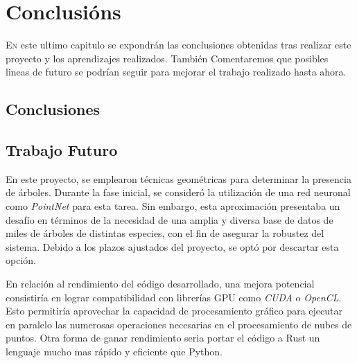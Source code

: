 \chapter{Conclusións}
\label{chap:conclusions}

\lettrine{E}{n} este ultimo capitulo se expondrán las conclusiones obtenidas tras realizar este proyecto y los aprendizajes realizados. También Comentaremos que posibles lineas de futuro se podrían seguir para mejorar el trabajo realizado hasta ahora.

\section{Conclusiones}


\section{Trabajo Futuro}
En este proyecto, se emplearon técnicas geométricas para determinar la presencia de árboles. Durante la fase inicial, se consideró la utilización de una red neuronal como \textit{PointNet} \cite{pointnet} para esta tarea. Sin embargo, esta aproximación presentaba un desafío en términos de la necesidad de una amplia y diversa base de datos de miles de árboles de distintas especies, con el fin de asegurar la robustez del sistema. Debido a los plazos ajustados del proyecto, se optó por descartar esta opción.

En relación al rendimiento del código desarrollado, una mejora potencial consistiría en lograr compatibilidad con librerías GPU como \textit{CUDA} o \textit{OpenCL}. Esto permitiría aprovechar la capacidad de procesamiento gráfico para ejecutar en paralelo las numerosas operaciones necesarias en el procesamiento de nubes de puntos. Otra forma de ganar rendimiento seria portar el código a Rust un lenguaje mucho mas rápido y eficiente que Python.